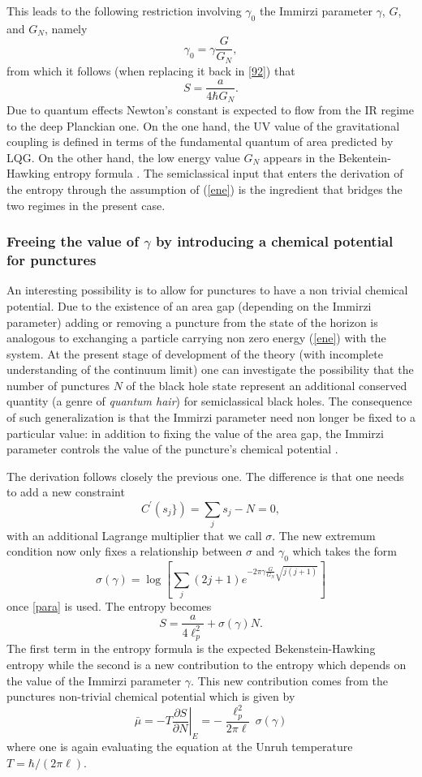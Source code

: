 \documentclass[aps, nofootinbib,superscriptaddress,12pt]{revtex4-2}
\newcommand{\nn}{\sqrt{j(j+1)}}
\def\be{\begin{equation}}
\def\ee{\end{equation}}
\begin{document}
This leads to the following restriction involving $\gamma_0$ the Immirzi parameter $\gamma$, $G$, and $G_N$, namely
\be\label{para} \gamma_0=\gamma \frac{G}{G_N},\ee from which it follows (when replacing it back in \eqref{92}) that
\be\label{entra}
S=\frac{a}{4\hbar G_N}.
\ee
Due to quantum effects Newton's 
constant is expected to flow from the IR regime to the deep Planckian one. On the one hand, the UV value of the gravitational coupling is defined in terms of the fundamental 
quantum of area predicted by LQG.  On the other hand, the low energy value $G_N$ appears in the Bekentein-Hawking entropy formula \cite{Jacobson:2007uj}. The semiclassical input that enters the derivation of the entropy 
through the assumption of (\ref{ene}) is the ingredient that bridges the two regimes in the present case.

\subsubsection{Freeing the value of $\gamma$ by introducing a chemical potential for punctures}

An interesting possibility is to allow for punctures to have a non trivial chemical potential.
Due to the existence of an area gap (depending on the Immirzi parameter) adding or removing a puncture from the state of the horizon is analogous to exchanging a particle carrying non zero energy (\ref{ene}) with the system. At the present stage of development of the theory (with incomplete understanding of the continuum limit) one can investigate the possibility that the number of punctures $N$ of the black hole state represent an additional conserved quantity (a genre of {\em quantum hair}) for semiclassical black holes. The consequence of such generalization is that the Immirzi parameter need non longer be fixed to a particular value: in addition to fixing the value of the area gap, the Immirzi parameter controls the value of the puncture's chemical potential \cite{Ghosh:2011fc}.

The derivation follows closely the previous one. The difference is that one needs to add a new constraint 
\be
C^{\prime}( s_j\})=\sum_j s_j-N=0,
\ee
with an additional Lagrange multiplier that we call $\sigma$.
The new extremum condition now only fixes a relationship between $\sigma$ and $\gamma_0$ which takes the form
\be
\sigma(\gamma)= \log[\sum_j (2j+1) e^{-2 \pi \gamma\frac{G}{G_N} \nn }]
\ee
once \eqref{para} is used.
The entropy becomes \be \label{entrobien}
S= \frac{a}{4\ell_p^2}+\sigma(\gamma) N.
\ee
The first term in the entropy formula is the expected Bekenstein-Hawking entropy while the second 
is a new contribution to the entropy which depends on the value of the Immirzi parameter $\gamma$.
This new contribution comes from the punctures non-trivial chemical potential which is given by
\be\label{cp}
\bar\mu=-T \left.\frac{\partial S}{\partial N}\right|_E=-\frac{\ell_p^2}{2\pi\ell}\,\sigma(\gamma)
\ee
where one is again evaluating the equation at the Unruh
temperature $T=\hbar/(2\pi \ell)$.
\end{document}
